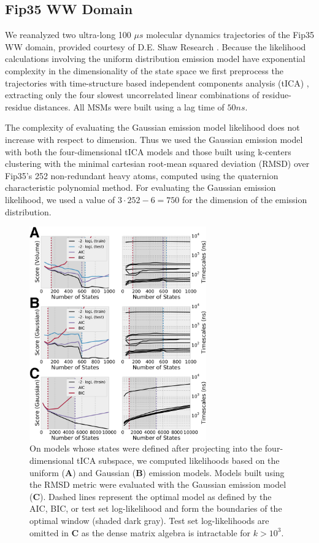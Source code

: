 \documentclass[journal=jpcbfk, layout=traditional, manuscript=article]{achemso}
\begin{document}
\subsection{Fip35 WW Domain}

We reanalyzed two ultra-long 100 $\mu s$ molecular dynamics trajectories of the Fip35 WW domain\cite{Liu2008Experimental}, provided courtesy of D.E. Shaw Research \cite{Shaw2010Atomic}. Because the likelihood calculations involving the uniform distribution emission model have exponential complexity in the dimensionality of the state space we first preprocess the trajectories with time-structure based independent components analysis (tICA) \cite{Schwantes2013Improvements, Perez2013Identification}, extracting only the four slowest uncorrelated linear combinations of residue-residue distances. All MSMs were built using a lag time of $50 ns$.

The complexity of evaluating the Gaussian emission model likelihood does not increase with respect to dimension. Thus we used the Gaussian emission model with both the four-dimensional tICA models and those built using k-centers clustering with the minimal cartesian root-mean squared deviation (RMSD) over Fip35's 252 non-redundant heavy atoms, computed using the quaternion characteristic polynomial method\cite{Theobald2005Rapid}. For evaluating the Gaussian emission likelihood, we used a value of $3 \cdot 252 - 6 = 750$ for the dimension of the emission distribution.

\begin{figure}
\centering
\includegraphics[width=3in]{figs_final/ww_likes.png}
\caption{On models whose states were defined after projecting into the four-dimensional tICA subspace, we computed likelihoods based on the uniform ({\bf A}) and Gaussian ({\bf B}) emission models. Models built using the RMSD metric were evaluated with the Gaussian emission model ({\bf C}). Dashed lines represent the optimal model as defined by the AIC, BIC, or test set log-likelihood and form the boundaries of the optimal window (shaded dark gray). Test set log-likelihoods are omitted in {\bf C} as the dense matrix algebra is intractable for $k > 10^3$.\label{fig:ww}}
\end{figure}
\end{document}
